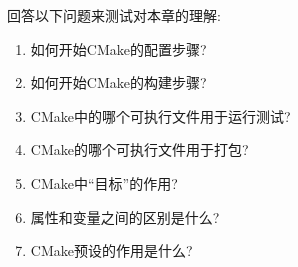 
回答以下问题来测试对本章的理解:

\begin{enumerate}
\item 
如何开始CMake的配置步骤?

\item 
如何开始CMake的构建步骤?

\item 
CMake中的哪个可执行文件用于运行测试?

\item 
CMake的哪个可执行文件用于打包?

\item 
CMake中“目标”的作用?

\item 
属性和变量之间的区别是什么?

\item 
CMake预设的作用是什么?
\end{enumerate}

